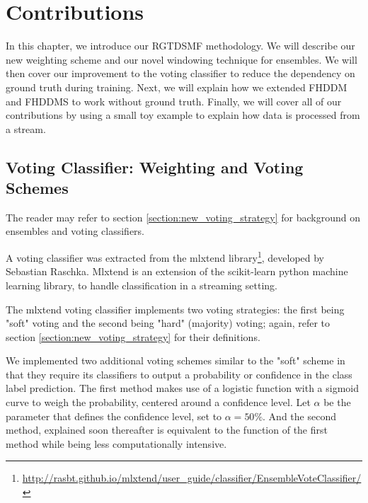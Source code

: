 \chapter{Contributions\label{chapter:contributions}}%

In this chapter, we introduce our RGTDSMF methodology. We will describe our new weighting scheme and our novel windowing technique for ensembles. We will then cover our improvement to the voting classifier to reduce the dependency on ground truth during training. Next, we will explain how we extended FHDDM and FHDDMS to work without ground truth. Finally, we will cover all of our contributions by using a small toy example to explain how data is processed from a stream.


\section{Voting Classifier: Weighting and Voting Schemes \label{section:new_voting_strategy}}

The reader may refer to section \ref{section:new_voting_strategy} for background on ensembles and voting classifiers.

A voting classifier was extracted from the mlxtend library\footnote{\url{http://rasbt.github.io/mlxtend/user_guide/classifier/EnsembleVoteClassifier/}}, developed by Sebastian Raschka. Mlxtend is an extension of the scikit-learn python machine learning library, to handle classification in a streaming setting.

The mlxtend voting classifier implements two voting strategies: the first being "soft" voting and the second being "hard" (majority) voting; again, refer to section \ref{section:new_voting_strategy} for their definitions.

We implemented two additional voting schemes similar to the "soft" scheme in that they require its classifiers to output a probability or confidence in the class label prediction. The first method makes use of a logistic function with a sigmoid curve to weigh the probability, centered around a  confidence level. Let $\alpha$ be the parameter that defines the confidence level, set to \textbf{\textit{$\alpha=50\%$}}. And the second method, explained soon thereafter is equivalent to the function of the first method while being less computationally intensive.


